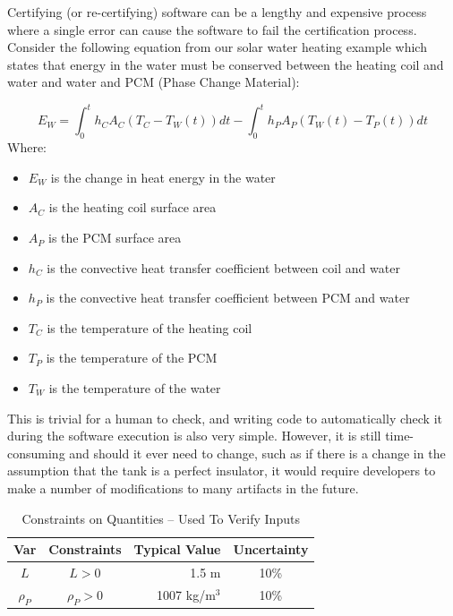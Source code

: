 \documentclass[sigconf]{acmart}
\newcommand{\authornt}[3]{\textcolor{#1}{[#3 ---#2]}}
\newcommand{\authornt}[3]{}
\newcommand{\wss}[1]{\authornt{blue}{SS}{#1}} %
\begin{document}
{Certifying (or re-certifying) software can be a lengthy and expensive process
where a single error can cause the software to fail the certification process.
Consider the following equation from our solar water heating example which
states that energy in the water must be conserved between the heating coil and
water and water and PCM (Phase Change Material):

\begin{equation*}
E_W = \int_{0}^{t} h_C A_C (T_C - T_W(t)) dt - \int_{0}^{t} h_P A_P (T_W(t) - T_P(t)) dt
\end{equation*}
Where:
\begin{itemize}
	\item $E_W$ is the change in heat energy in the water
	\item $A_C$ is the heating coil surface area
	\item $A_P$ is the PCM surface area
	\item $h_C$ is the convective heat transfer coefficient between coil and 
	water
	\item $h_P$ is the convective heat transfer coefficient between PCM and 
	water 
	\item $T_C$ is the temperature of the heating coil
	\item $T_P$ is the temperature of the PCM
	\item $T_W$ is the temperature of the water
\end{itemize}

This is trivial for a human to check, and writing code to automatically check it
during the software execution is also very simple. However, it is still
time-consuming and should it ever need to change, such as if there is a change
in the assumption that the tank is a perfect insulator, it would require
developers to make a number of modifications to many artifacts in the future.

\begin{table} 
\centering
\caption{Constraints on Quantities -- Used To Verify Inputs}
\begin{tabular}{c c r c } 
\toprule
\textbf{Var} & \textbf{Constraints} & \textbf{Typical Value} & \textbf{Uncertainty}\\ \midrule
$L$ & $L > 0$ & 1.5 m & 10\% \\ 
$\rho_P$ & $\rho_P > 0$	& 1007 kg/m$^3$	& 10\% \\
\bottomrule
\end{tabular}
\label{tab:pcm}
\end{table}

}
\end{document}
